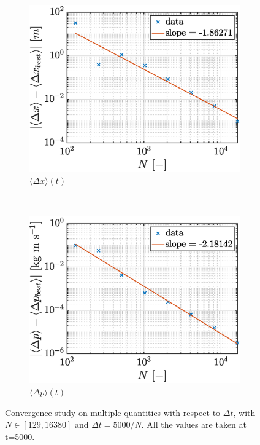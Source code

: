 \documentclass[a4paper,12pt,twoside]{article}
\begin{document}
\begin{figure}[h]
      \begin{subfigure}{0.45\textwidth}
        \includegraphics[width=\textwidth]{graphs/i_conv_dx.eps}
        \caption{$\langle \Delta x \rangle (t)$}
        \label{fig:i_conv_dx}
      \end{subfigure}
      ~
      \begin{subfigure}{0.45\textwidth}
        \includegraphics[width=\textwidth]{graphs/i_conv_dp.eps}
        \caption{$\langle \Delta p \rangle (t)$}
        \label{fig:i_conv_dp}
      \end{subfigure}
      \caption{Convergence study on multiple quantities with respect to $\Delta t$, with $N\in[\num{129}, \num{16380}]$ and $\Delta t = \num{5000}/N$. All the values are taken at t=5000.}
      \label{fig:i_conv}
    \end{figure}
\end{document}
